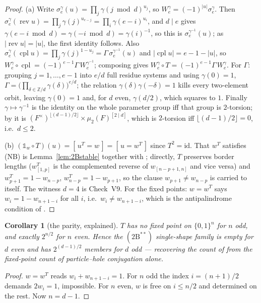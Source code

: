 \documentclass[11pt]{article}
\newtheorem{corollary}[theorem]{Corollary}
\theoremstyle{definition}
\theoremstyle{remark}
\newcommand{\Z}{\mathbb{Z}}
\newcommand{\rev}{\operatorname{rev}}
\newcommand{\cpl}{\operatorname{cpl}}
\begin{document}
\begin{proof}
(a) Write $\sigma^{\gamma}_e(u)=\prod_j\gamma(j\bmod d)^{u_j}$, so
$W^{\gamma}_e=(-1)^{|u|}\sigma^{\gamma}_e$.  Then
$\sigma^{\gamma}_e(\rev u)=\prod_{j}\gamma(j)^{u_{e-j}}=\prod_i\gamma(e-i)^{u_i}$, and $d\mid e$
gives $\gamma(e-i\bmod d)=\gamma(-i\bmod d)=\gamma(i)^{-1}$, so this is
$\sigma^{\gamma^{-1}}_e(u)$; as $|\rev u|=|u|$, the first identity follows.  Also
$\sigma^{\gamma}_e(\cpl u)=\prod_j\gamma(j)^{1-u_j}=\Gamma\,\sigma^{\gamma^{-1}}_e(u)$ and
$|\cpl u|=e-1-|u|$, so $W^{\gamma}_e\circ\cpl=(-1)^{e-1}\Gamma\,W^{\gamma^{-1}}_e$; composing
gives $W^{\gamma}_e\circ T=(-1)^{e-1}\Gamma\,W^{\gamma}_e$.  For $\Gamma$: grouping
$j=1,\dots,e-1$ into $e/d$ full residue systems and using $\gamma(0)=1$,
$\Gamma=\bigl(\prod_{\delta\in\Z/d}\gamma(\delta)\bigr)^{e/d}$; the relation
$\gamma(\delta)\gamma(-\delta)=1$ kills every two-element orbit, leaving $\gamma(0)=1$ and,
for $d$ even, $\gamma(d/2)$, which squares to $1$.  Finally $\gamma\mapsto\gamma^{-1}$ is the
identity on the whole parameter group iff that group is $2$-torsion; by
\cite[Cor.~\texttt{cor:size}]{Q149} it is
$(F^{\times})^{\lfloor(d-1)/2\rfloor}\times\mu_2(F)^{[2\mid d]}$, which is $2$-torsion iff
$\lfloor(d-1)/2\rfloor=0$, i.e.\ $d\le2$.

(b) $(\mathbb 1_w\circ T)(u)=[\,u^{T}=w\,]=[\,u=w^{T}\,]$ since $T^{2}=\mathrm{id}$.  That
$w^{T}$ satisfies (NB) is Lemma~\ref{lem:2Bstable} together with
\cite[Thm.~\texttt{thm:singleton}]{Q150c2}; directly, $T$ preserves border lengths
($w^{T}_{[1,p]}$ is the complemented reverse of $w_{[n-p+1,n]}$ and vice versa) and
$w^{T}_{p+1}=1-w_{n-p}$, $w^{T}_{n-p}=1-w_{p+1}$, so the clause $w_{p+1}\ne w_{n-p}$ is
carried to itself.  The witness $d=4$ is Check~V9.  For the fixed points:
$w=w^{T}$ says $w_i=1-w_{n+1-i}$ for all $i$, i.e.\ $w_i\ne w_{n+1-i}$, which is the
antipalindrome condition of \cite[Thm.~\texttt{thm:singleton2}]{Q150c2}.
\end{proof}

\begin{corollary}[the parity, explained]\label{cor:parity}
$T$ has no fixed point on $\{0,1\}^{n}$ for $n$ odd, and exactly $2^{n/2}$ for $n$ even.
Hence the $(2\mathrm B^{**})$ single-shape family is empty for $d$ even and has
$2^{(d-1)/2}$ members for $d$ odd --- recovering the count of
\cite[Thm.~\texttt{thm:singleton2}]{Q150c2} from the fixed-point count of particle--hole
conjugation alone.
\end{corollary}

\begin{proof}
$w=w^{T}$ reads $w_i+w_{n+1-i}=1$.  For $n$ odd the index $i=(n+1)/2$ demands $2w_i=1$,
impossible.  For $n$ even, $w$ is free on $i\le n/2$ and determined on the rest.  Now
$n=d-1$.
\end{proof}
\end{document}
